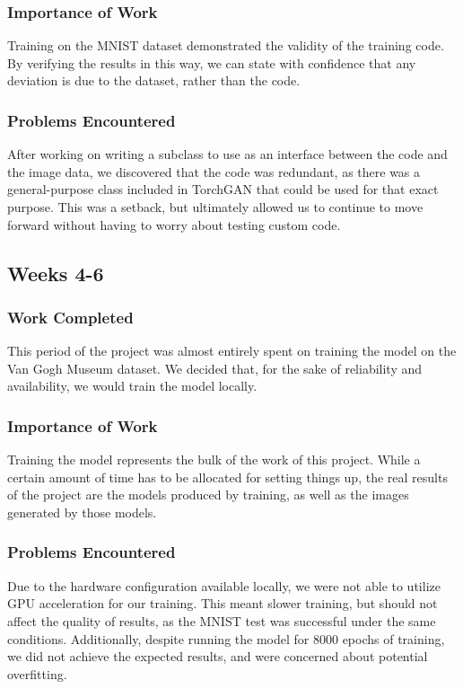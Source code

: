 \documentclass[12pt,letterpaper]{article}
\begin{document}
	\subsubsection{Importance of Work}
	Training on the MNIST dataset demonstrated the validity of the training code.
	By verifying the results in this way, we can state with confidence that any deviation is due to the dataset, rather than the code.

	\subsubsection{Problems Encountered}
	After working on writing a subclass to use as an interface between the code and the image data, we discovered that the code was redundant, as there was a general-purpose class included in TorchGAN that could be used for that exact purpose.
	This was a setback, but ultimately allowed us to continue to move forward without having to worry about testing custom code.

	\subsection{Weeks 4-6}
	\subsubsection{Work Completed}
	This period of the project was almost entirely spent on training the model on the Van Gogh Museum dataset.
	We decided that, for the sake of reliability and availability, we would train the model locally.
	\subsubsection{Importance of Work}
	Training the model represents the bulk of the work of this project.
	While a certain amount of time has to be allocated for setting things up, the real results of the project are the models produced by training, as well as the images generated by those models.
	\subsubsection{Problems Encountered}
	Due to the hardware configuration available locally, we were not able to utilize GPU acceleration for our training.
	This meant slower training, but should not affect the quality of results, as the MNIST test was successful under the same conditions.
	Additionally, despite running the model for 8000 epochs of training, we did not achieve the expected results, and were concerned about potential overfitting.
\end{document}
